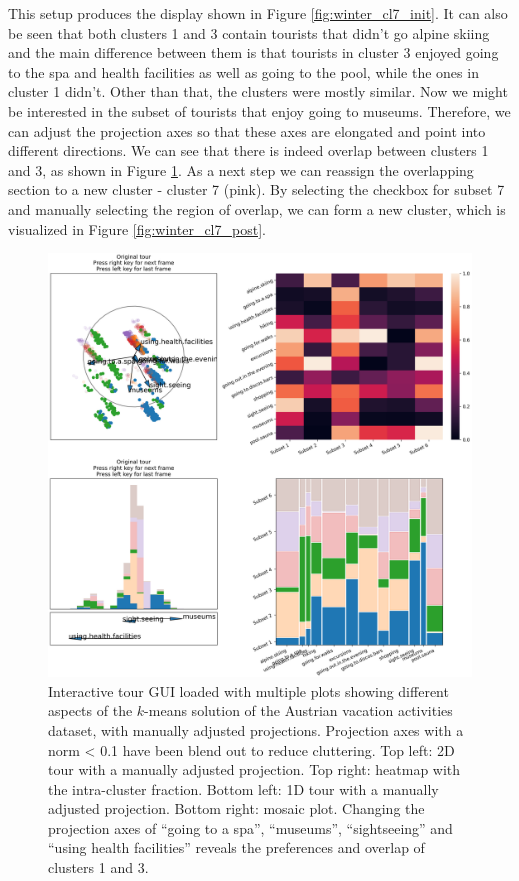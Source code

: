 \documentclass[article]{ajs}
\begin{document}
This setup produces the display shown in Figure \ref{fig:winter_cl7_init}. It can also be seen that both clusters 1 and 3 contain tourists that didn't go alpine skiing and the main difference between them is that tourists in cluster 3 enjoyed going to the spa and health facilities as well as going to the pool, while the ones in cluster 1 didn't. Other than that, the clusters were mostly similar. Now we might be interested in the subset of tourists that enjoy going to museums. Therefore, we can adjust the projection axes so that these axes are elongated and point into different directions. We can see that there is indeed overlap between clusters 1 and 3, as shown in Figure \ref{fig:winter_cl7_pre}. As a next step we can reassign the overlapping section to a new cluster - cluster 7 (pink). By selecting the checkbox for subset 7 and manually selecting the region of overlap, we can form a new cluster, which is visualized in Figure \ref{fig:winter_cl7_post}.

\begin{figure}[h!]
    \centering
    \includegraphics[width=1\textwidth]{winter_cl7_pre.pdf}
    \caption{Interactive tour GUI loaded with multiple plots showing different aspects of the $k$-means solution of the Austrian vacation activities dataset, with manually adjusted projections. Projection axes with a norm < 0.1 have been blend out to reduce cluttering. Top left: 2D tour with a manually adjusted projection. Top right: heatmap with the intra-cluster fraction. Bottom left: 1D tour with a manually adjusted projection. Bottom right: mosaic plot. Changing the projection axes of ``going to a spa'', ``museums'', ``sightseeing'' and ``using health facilities'' reveals the preferences and overlap of clusters 1 and 3.}
    \label{fig:winter_cl7_pre}
\end{figure}
\end{document}
